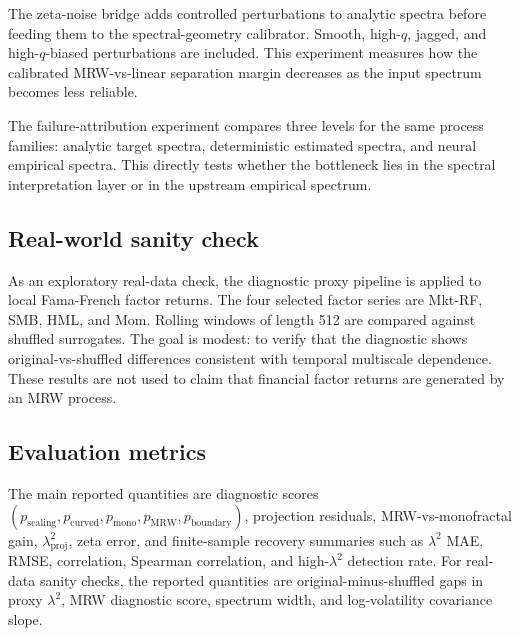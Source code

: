 The zeta-noise bridge adds controlled perturbations to analytic spectra before
feeding them to the spectral-geometry calibrator. Smooth, high-\(q\), jagged,
and high-\(q\)-biased perturbations are included. This experiment measures how
the calibrated MRW-vs-linear separation margin decreases as the input spectrum
becomes less reliable.

The failure-attribution experiment compares three levels for the same process
families: analytic target spectra, deterministic estimated spectra, and neural
empirical spectra. This directly tests whether the bottleneck lies in the
spectral interpretation layer or in the upstream empirical spectrum.

\subsection{Real-world sanity check}

As an exploratory real-data check, the diagnostic proxy pipeline is applied to
local Fama-French factor returns. The four selected factor series are Mkt-RF,
SMB, HML, and Mom. Rolling windows of length 512 are compared against shuffled
surrogates. The goal is modest: to verify that the diagnostic shows
original-vs-shuffled differences consistent with temporal multiscale
dependence. These results
are not used to claim that financial factor returns are generated by an MRW
process.

\subsection{Evaluation metrics}

The main reported quantities are diagnostic scores
\((p_{\mathrm{scaling}},p_{\mathrm{curved}},p_{\mathrm{mono}},
p_{\mathrm{MRW}},p_{\mathrm{boundary}})\), projection residuals,
MRW-vs-monofractal gain, \(\lambda^2_{\mathrm{proj}}\), zeta error, and
finite-sample recovery summaries such as \(\lambda^2\) MAE, RMSE, correlation,
Spearman correlation, and high-\(\lambda^2\) detection rate. For real-data
sanity checks, the reported quantities are original-minus-shuffled gaps in
proxy \(\lambda^2\), MRW diagnostic score, spectrum width, and log-volatility
covariance slope.
